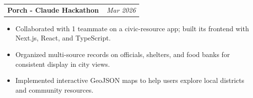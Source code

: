 \documentclass[10pt,letterpaper]{article}
\makeatletter
\newcommand{\projectEntry}[2]{%
  \hspace{6.7pt}\begin{tabular*}{\dimexpr\textwidth-13.4pt}{@{\extracolsep{\fill}} l r}
    \textbf{#1} & \textit{#2} \\
  \end{tabular*}
  \par\vspace{-2pt}
}
\newenvironment{resumeBullets}{%
  \begin{itemize}[leftmargin=28pt,rightmargin=6.7pt,label=$\circ$,labelsep=4pt,itemsep=0pt,topsep=0pt,parsep=0pt,partopsep=0pt]
}{%
  \end{itemize}
  \vspace{0pt}
}
\newcommand{\resumeItem}[1]{\item #1}
\makeatother
\begin{document}
\vspace{4pt}
\projectEntry{Porch - Claude Hackathon\,\href{https://github.com/yhough/Porch}{\raisebox{0.05ex}{\fontsize{9}{9}\selectfont\faExternalLink*}}}{Mar 2026}
\begin{resumeBullets}
  \resumeItem{Collaborated with 1 teammate on a civic-resource app; built its frontend with Next.js, React, and TypeScript.}
  \resumeItem{Organized multi-source records on officials, shelters, and food banks for consistent display in city views.}
  \resumeItem{Implemented interactive GeoJSON maps to help users explore local districts and community resources.}
\end{resumeBullets}
\end{document}
